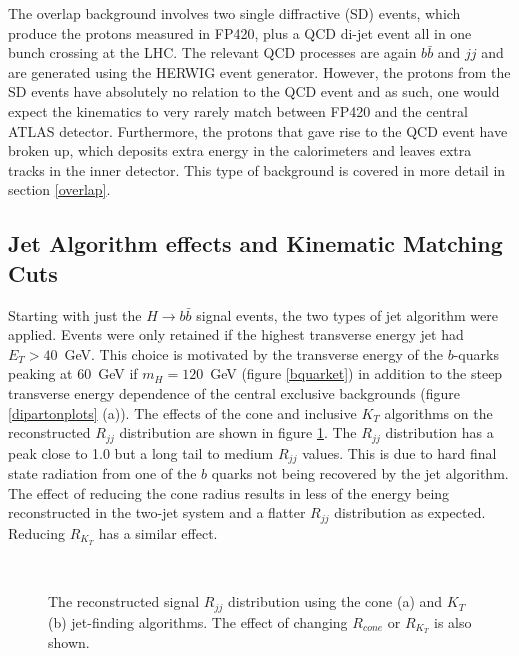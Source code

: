 The overlap background involves two single diffractive (SD) events, which produce the protons measured in FP420, plus a QCD di-jet event all in one bunch crossing at the LHC. The relevant QCD processes are again $b\bar{b}$ and $jj$ and are generated using the HERWIG event generator. However, the protons from the SD events have absolutely no relation to the QCD event and as such, one would expect the kinematics to very rarely match between FP420 and the central ATLAS detector. Furthermore, the protons that gave rise to the QCD event have broken up, which deposits extra energy in the calorimeters and leaves extra tracks in the inner detector. This type of background is covered in more detail in section \ref{overlap}.

\subsection{Jet Algorithm effects and Kinematic Matching Cuts}\label{kinematicmatch}

Starting with just the $H\rightarrow b\bar{b}$ signal events, the two types of jet algorithm were applied. Events  were only retained if the highest transverse energy jet had $E_T > 40$~GeV. This choice is motivated by the transverse energy of the $b$-quarks peaking at 60~GeV if $m_H=120$~GeV (figure \ref{bquarket}) in addition to the  steep transverse energy dependence of the central exclusive backgrounds (figure \ref{dipartonplots} (a)). The effects of the cone and inclusive $K_T$ algorithms on the reconstructed $R_{jj}$
distribution are shown in figure \ref{higgsrjj}.
The $R_{jj}$ distribution has a peak close to 1.0 but a long tail to medium $R_{jj}$ values. This is due to hard final state radiation from one of the $b$ quarks not being recovered by the jet algorithm. The effect of reducing the cone radius results in less of the energy being reconstructed in the two-jet system and a flatter $R_{jj}$ distribution as expected. Reducing $R_{K_T}$ has a similar effect.


\begin{figure} 
\centering
\mbox{
}
\caption[The effect of the cone and $K_T$ algorithms on the signal $R_{jj}$ distribution]{The reconstructed signal $R_{jj}$ distribution using the cone (a) and $K_T$ (b) jet-finding algorithms. The effect of changing $R_{cone}$ or $R_{K_T}$ is also shown. \label{higgsrjj}}
\end{figure}

